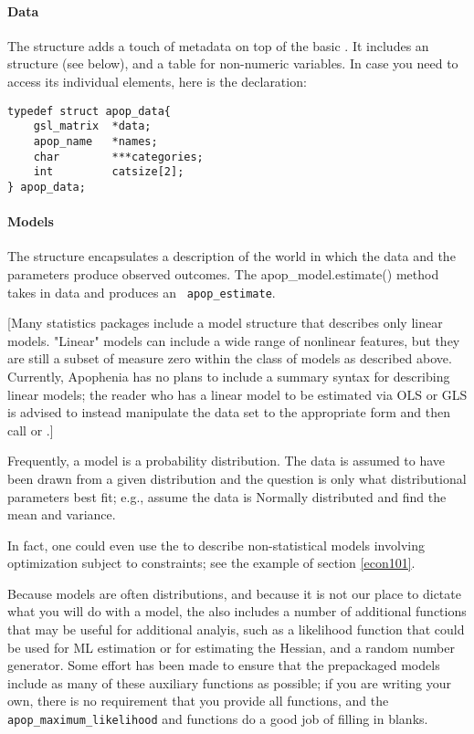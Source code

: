 \paragraph{Data}
The  structure adds a touch of metadata on top of the
basic . It includes an  structure (see
below), and a table for non-numeric variables. In case you need to access
its individual elements, here is the declaration:

\begin{lstlisting}
typedef struct apop_data{
    gsl_matrix  *data;
    apop_name   *names;
    char        ***categories;
    int         catsize[2];
} apop_data;
\end{lstlisting}

\paragraph{Models}
The  structure encapsulates a description of the world
in which the data and the parameters produce observed outcomes. The
apop\_model.estimate() method takes in data and produces an {\tt
apop\_estimate}. 

[Many statistics packages include a model structure that describes only
linear models.  "Linear" models can include a wide range of nonlinear
features, but they are still a subset of measure zero within the class of
models as described above. Currently, Apophenia has no plans to include
a summary syntax for describing linear models; the reader who has a linear
model to be estimated via OLS or GLS is advised to instead manipulate
the data set to the appropriate form and then call  or
.]

Frequently, a model is a probability distribution. The data is assumed
to have been drawn from a given distribution and the question is
only what distributional parameters best fit; e.g., assume the data
is Normally distributed and find the mean and variance.

In fact, one could even use the  to describe 
non-statistical models involving optimization subject to constraints;
see the example of section \ref{econ101}.

Because models are often distributions, and because it is not our place
to dictate what you will do with a model, the  also includes a
number of additional functions that may be useful for additional analyis,
such as a likelihood function that could be used for ML estimation or
for estimating the Hessian, and a random number generator. Some effort
has been made to ensure that the prepackaged models include as many of
these auxiliary functions as possible; if you are writing your own,
there is no requirement that you provide all functions, and the {\tt
apop\_maximum\_likelihood} and 
functions do a good job of filling in blanks.

